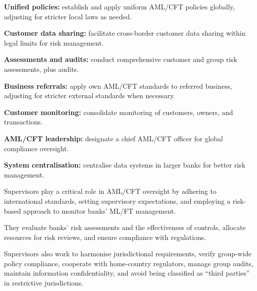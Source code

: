

\begin{lettered}
\item \textbf{Unified policies:} establish and apply uniform AML/CFT policies
globally, adjusting for stricter local laws as needed.
\item \textbf{Customer data sharing:} facilitate cross-border customer data
sharing within legal limits for risk management.
\item \textbf{Assessments and audits:} conduct comprehensive customer and group
risk assessments, plus audits.
\item \textbf{Business referrals:} apply own AML/CFT standards to referred
business, adjusting for stricter external standards when necessary.
\item \textbf{Customer monitoring:} consolidate monitoring of customers, owners,
and transactions.
\item \textbf{AML/CFT leadership:} designate a chief AML/CFT officer for global
compliance oversight.
\item \textbf{System centralisation:} centralise data systems in larger banks for
better risk management.
\end{lettered}


\begin{lettered}
\item Supervisors play a critical role in AML/CFT oversight by adhering to
international standards, setting supervisory expectations, and employing a
risk-based approach to monitor banks' ML/FT management.
\item They evaluate banks' risk assessments and the effectiveness of controls,
allocate resources for risk reviews, and ensure compliance with regulations.
\item Supervisors also work to harmonise jurisdictional requirements, verify
group-wide policy compliance, cooperate with home-country regulators, manage
group audits, maintain information confidentiality, and avoid being classified as
``third parties'' in restrictive jurisdictions.
\end{lettered}
